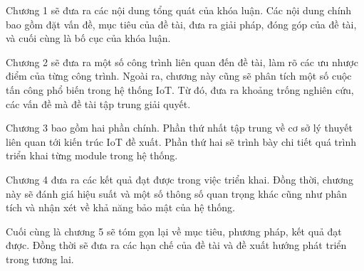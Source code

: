 Chương 1 sẽ đưa ra các nội dung tổng quát của khóa luận. Các nội dung chính 
bao gồm đặt vấn đề, mục tiêu của đề tài, đưa ra giải pháp, đóng góp của đề tài, và cuối cùng là bố cục của khóa luận.

Chương 2 sẽ đưa ra một số công trình liên quan đến đề tài, làm rõ các ưu nhược điểm của từng công trình.
Ngoài ra, chương này cũng sẽ phân tích một số cuộc tấn công phổ biến trong hệ thống IoT. Từ đó, đưa ra khoảng trống nghiên cứu, 
các vấn đề mà đề tài tập trung giải quyết.

Chương 3 bao gồm hai phần chính. Phần thứ nhất tập trung về cơ sở lý thuyết liên quan tới kiến trúc IoT đề xuất. Phần thứ hai sẽ trình bày
chi tiết quá trình triển khai từng module trong hệ thống.

Chương 4 đưa ra các kết quả đạt được trong việc triển khai. Đồng thời, chương này sẽ đánh giá hiệu suất và một số thông số quan trọng khác cũng như
phân tích và nhận xét về khả năng bảo mật của hệ thống.

Cuối cùng là chương 5 sẽ tóm gọn lại về mục tiêu, phương pháp, kết quả đạt được. Đồng thời sẽ đưa ra các hạn chế của đề tài và 
đề xuất hướng phát triển trong tương lai.


